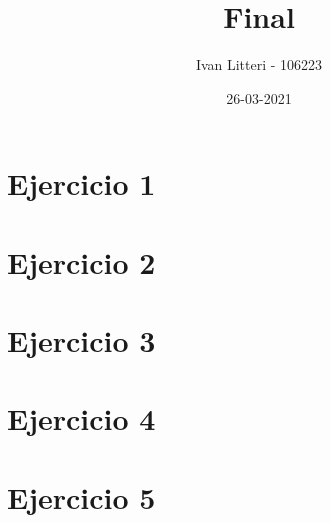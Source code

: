 \documentclass[hidelinks]{article}
\title{Final}
\author{Ivan Litteri - 106223}
\date{26-03-2021}
\begin{document}
\maketitle
\lstset{language=C}
\lstset{language=Python}
\tableofcontents
\clearpage

\section{Ejercicio 1}

\clearpage

\section{Ejercicio 2}

\clearpage

\section{Ejercicio 3}

\clearpage

\section{Ejercicio 4}

\clearpage

\section{Ejercicio 5}

\clearpage

\printindex
\end{document}
